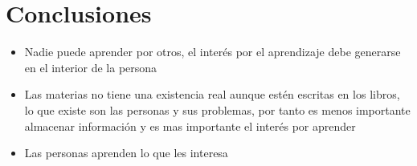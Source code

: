 \section*{Conclusiones}
\begin{itemize}
\item Nadie puede aprender por otros, el interés por el aprendizaje debe generarse en el interior de la persona
\item Las materias no tiene una existencia real aunque estén escritas en los libros, lo que existe son las personas y sus problemas, por tanto es menos importante almacenar información y es mas importante el interés por aprender
\item Las personas aprenden lo que les interesa
\end{itemize}
